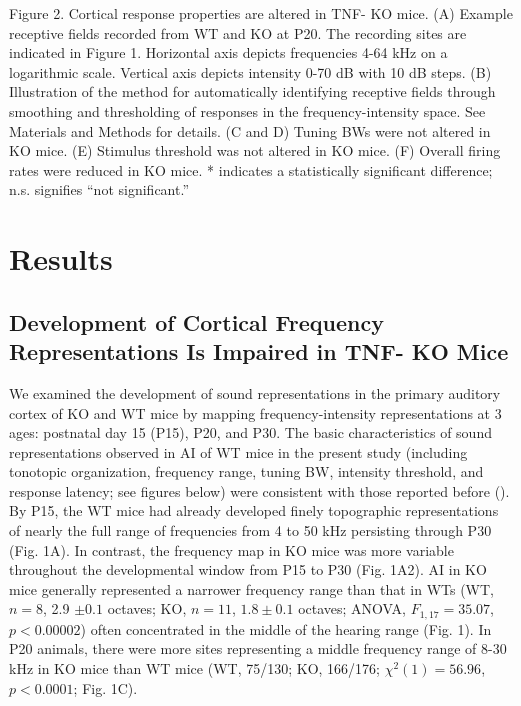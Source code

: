 \begin{changemargin}{1in}{1in}
\footnotesize{Figure 2. Cortical response properties are altered in TNF-\textalpha{} KO mice. (A) Example receptive fields recorded from WT and KO at P20. The recording sites are indicated in Figure 1. Horizontal axis depicts frequencies 4-64 kHz on a logarithmic scale. Vertical axis depicts intensity 0-70 dB with 10 dB steps. (B) Illustration of the method for automatically identifying receptive fields through smoothing and thresholding of responses in the frequency-intensity space. See Materials and Methods for details. (C and D) Tuning BWs were not altered in KO mice. (E) Stimulus threshold was not altered in KO mice. (F) Overall firing rates were reduced in KO mice. * indicates a statistically significant difference; n.s. signifies “not significant.”}
\end{changemargin}

\section{Results}

\subsection{Development of Cortical Frequency Representations Is Impaired in TNF-\textalpha{}  KO Mice}

We examined the development of sound representations in the primary auditory cortex of KO and WT mice by mapping frequency-intensity representations at 3 ages: postnatal day 15 (P15), P20, and P30. The basic characteristics of sound representations observed in AI of WT mice in the present study (including tonotopic organization, frequency range, tuning BW, intensity threshold, and response latency; see figures below) were consistent with those reported before (\cite{Guo2012}). By P15, the WT mice had already developed finely topographic representations of nearly the full range of frequencies from 4 to 50 kHz persisting through P30 (Fig. 1A). In contrast, the frequency map in KO mice was more variable throughout the developmental window from P15 to P30 (Fig. 1A2). AI in KO mice generally represented a narrower frequency range than that in WTs (WT, $n = 8$, 2.9 $\pm0.1$ octaves; KO, $n = 11$, $1.8\pm0.1$ octaves; ANOVA, $F_{1,17}=35.07$, $p<0.00002$) often concentrated in the middle of the hearing range (Fig. 1). In P20 animals, there were more sites representing a middle frequency range of 8-30 kHz in KO mice than WT mice (WT, 75/130; KO, 166/176; $\chi^2(1)=56.96$, $p<0.0001$; Fig. 1C).

